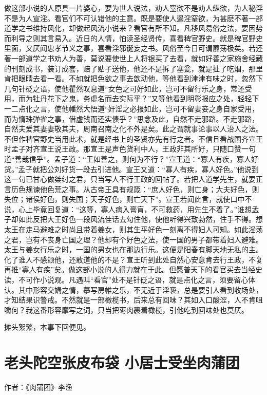 \documentclass[a4paper,12pt,UTF8,twoside]{ctexbook}
\begin{document}
做这部小说的人原具一片婆心，要为世人说法，劝人窒欲不是劝人纵欲，为人秘淫不是为人宣淫。看官们不可认错他的主意。既是要使人遏淫窒欲，为甚麽不著一部道学之书维持风化，却做起风流小说来？看官有所不知。凡移风易俗之法，要因势而利导之则其言易入。近日的人情，怕读圣经贤传，喜看稗官野史。就是稗官野史里面，又厌闻忠孝节义之事，喜看淫邪诞妄之书。风俗至今日可谓蘼荡极矣。若还著一部道学之书劝人为善，莫说要使世上人将银买了去看，就如好善之家施舍经藏的刊刻成书，装订成套，赔了贴子送他，他还不是拆了塞瓮，就是扯了吃烟，那里肯把眼睛去看一看。不如就把色欲之事去歆动他，等他看到津津有味之时，忽然下几句针砭之语，使他瞿然叹息道“女色之可好如此，岂可不留行乐之身，常还受用，而为牡丹花下之鬼，务虚名而去实际乎？”又等他看到明彰报应之处，轻轻下一二点化之言，使他幡然大悟道“奸淫之必报如此，岂可不留妻妾之身自家受用，而为惰珠弹雀之事，借虚钱而还实债乎？”思念及此，自然不走邪路。不走邪路，自然夫爱其妻妻敬其夫，周南召南之化不外是矣。此之谓就事论事以人治人之法。不但作稗官野史当用此术，就是经书上的圣贤亦先有行之者。不信且看战国齐宣王时孟子对齐宣王说王政。那宣王是声色货利中人，王政非其所好，只随口赞一句道“善哉信乎”。孟子道：“王如善之，则何为不行？”宣王道：“寡人有疾，寡人好货。”孟子就把公刘好货一段去引进他。宣王又道：“寡人有疾，寡人好色。”他说到这一句已甘心做桀纣之君，只当写人不行王政的回帖了。若把人道学先生，就要正言历色规谏他色荒之事。从古帝王具有规箴：“庶人好色，则亡身；大夫好色，则失位；诸侯好色，则失国；天子好色，则亡天下”。宣王若闻此言，就使口中不说，心上毕竟回复道：“这等，寡人病入膏肓，不可救药，用先生不着了。”谁想孟子却如此反把大王好色一段风流佳话去勾住他，使他听得兴致勃然，住手不得。想太王在走马避难之时尚且带着姜女，则其生平好色一刻离不得妇人可知。如此淫荡之君，岂有不丧身亡国之理？他却有个好色之法，使一国的男子都带着妇人避难。太王与姜女行乐之时，一国的男女也在那边行乐。这便是阳春有脚天地无私的主。化了谁人不感颂他，还敢道他的不是？宣王听到此处自然心安意肯去行王政，不复再推“寡人有疾”矣。做这部小说的人得力就在于此。但愿普天下的看官买去当经史读，不可作小说观。凡遇叫“看官”处不是针砭之语，就是点化之言，须要留心体认。其中形容交媾之情，摹写房帷之乐，不无近于淫亵，总是要引人看到收场处，才知结果识警戒。不然就是一部橄榄书，后来总有回味？其如入口酸涩，人不肯咀嚼何？我这番形容摩写之词，只当把枣肉裹着橄榄，引他吃到回味处也莫厌。

摊头絮繁，本事下回便见。

\chapter{老头陀空张皮布袋 小居士受坐肉蒲团}

作者：《肉蒲团》李渔
\end{document}
